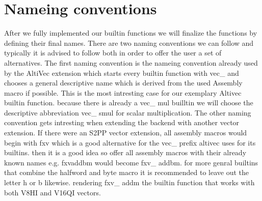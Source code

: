 \chapter{Nameing conventions}
\label{chapter:nameing conventions}
After we fully implemented our builtin functions we will finalize the functions by defining their final names. There are two naming conventions we can follow and typically it is advised to follow both in order to offer the user a set of alternatives. The first naming convention is the nameing convention already used by the AltiVec extension which starts every builtin function with vec\_ and chooses a general descriptive name which is derived from the used Assembly macro if possible.
This is the most intresting case for our exemplary Altivec builtin function. because there is already a vec\_ mul builltin we will choose the descriptive abbreviation vec\_ smul for scalar multiplication.
The other naming convention gets intresting when extending the backend with another vector extension. If there were an S2PP vector extension, all assembly macros would begin with fxv which is a good alternative for the vec\_ prefix altivec uses for its builtins. then it is a good idea so offer all assembly macros with their already known names e.g. fxvaddbm would become fxv\_ addbm. for more genral builtins that combine the halfword and byte macro it is recommended to leave out the letter h or b likewise. rendering fxv\_ addm the builtin function that works with both V8HI and V16QI vectors.
